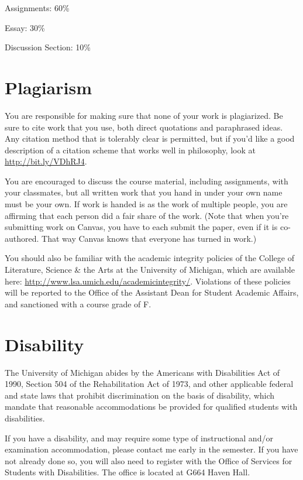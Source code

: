 \documentclass[10pt]{article}
\begin{document}
\begin{itemize*}
\item Assignments: 60\%
\item Essay: 30\% 
\item Discussion Section: 10\%
\end{itemize*}


\newpage
\section*{Plagiarism}

\noindent  You are responsible for making sure that none of your work is plagiarized. Be sure to cite work that you use, both direct quotations and paraphrased ideas. Any citation method that is tolerably clear is permitted, but if you'd like a good description of a citation scheme that works well in philosophy, look at \url{http://bit.ly/VDhRJ4}.\smallskip

You are encouraged to discuss the course material, including assignments, with your classmates, but all written work that you hand in under your own name must be your own. If work is handed is as the work of multiple people, you are affirming that each person did a fair share of the work. (Note that when you're submitting work on Canvas, you have to each submit the paper, even if it is co-authored. That way Canvas knows that everyone has turned in work.)\smallskip

You should also be familiar with the academic integrity policies of the College of Literature, Science \& the Arts at the University of Michigan, which are available here: \url{http://www.lsa.umich.edu/academicintegrity/}. Violations of these policies will be reported to the Office of the Assistant Dean for Student Academic Affairs, and sanctioned with a course grade of F.

\section*{Disability}

\noindent  The University of Michigan abides by the Americans with Disabilities Act of 1990, Section 504 of the Rehabilitation Act of 1973, and other applicable federal and state laws that prohibit discrimination on the basis of disability, which mandate that reasonable accommodations be provided for qualified students with disabilities. \smallskip

If you have a disability, and may require some type of instructional and\slash or examination accommodation, please contact me early in the semester. If you have not already done so, you will also need to register with the Office of Services for Students with Disabilities. The office is located at G664 Haven Hall. \smallskip
\end{document}
